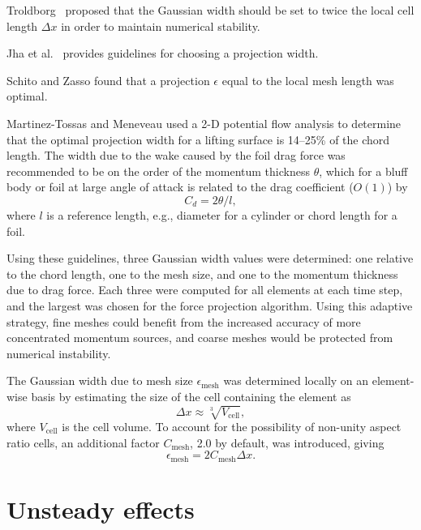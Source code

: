 Troldborg~\cite{Troldborg2008} proposed that the Gaussian width should be set to
twice the local cell length $\Delta x$ in order to maintain numerical stability.

Jha et al.~\cite{Jha2014} provides guidelines for choosing a projection
width.

Schito and Zasso \cite{Schito2014} found that a projection $\epsilon$ equal to
the local mesh length was optimal.

Martinez-Tossas and Meneveau \cite{Martinez-Tossas2015b} used a 2-D potential
flow analysis to determine that the optimal projection width for a lifting
surface is 14--25\% of the chord length. The width due to the wake caused by the
foil drag force was recommended to be on the order of the momentum thickness
$\theta$, which for a bluff body or foil at large angle of attack is related to
the drag coefficient ($O(1)$) by \cite{TennekesAndLumley}
\begin{equation}
    C_d = 2 \theta / l,
    \label{eq:mom-thickness}
\end{equation}
where $l$ is a reference length, e.g., diameter for a cylinder or chord length
for a foil.

Using these guidelines, three Gaussian width values were determined: one
relative to the chord length, one to the mesh size, and one to the momentum
thickness due to drag force. Each three were computed for all elements at each
time step, and the largest was chosen for the force projection algorithm. Using
this adaptive strategy, fine meshes could benefit from the increased accuracy of
more concentrated momentum sources, and coarse meshes would be protected from
numerical instability.

The Gaussian width due to mesh size $\epsilon_{\mathrm{mesh}}$ was determined
locally on an element-wise basis by estimating the size of the cell containing
the element as
\begin{equation}
    \Delta x \approx \sqrt[3]{V_\mathrm{cell}},
\end{equation}
where $V_\mathrm{cell}$ is the cell volume. To account for the possibility of non-unity aspect ratio cells, an additional factor $C_\mathrm{mesh}$, 2.0 by default, was introduced, giving
\begin{equation}
    \epsilon_{\mathrm{mesh}} = 2C_\mathrm{mesh} \Delta x.
\end{equation}


\section{Unsteady effects}

